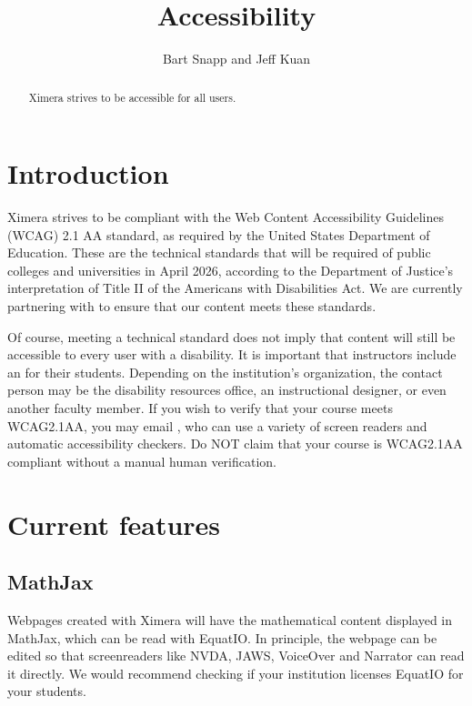 \documentclass{ximera}
\author{Bart Snapp and Jeff Kuan}
\title{Accessibility}
\begin{document}
\begin{abstract}
Ximera strives to be accessible for all users.
\end{abstract}
\maketitle

\section{Introduction}
Ximera strives to be compliant with the Web Content Accessibility Guidelines (WCAG) 2.1 AA standard, as required by the United States
Department of Education. These are the technical standards that will be required of public colleges and universities in April 2026, 
according to the Department of Justice's interpretation of Title II of the Americans with Disabilities Act. 
We are currently partnering with  
to ensure that our content meets these standards.

Of course, meeting a technical standard does not imply that content will still be accessible to every user with a disability. 
It is important that instructors include an  for their
students. Depending on the institution's organization, the contact person may be the disability resources office, an instructional designer, 
or even another faculty member. If you wish to verify that your course meets WCAG2.1AA, you may email ,
who can use a variety of screen readers and automatic accessibility checkers. Do NOT claim that your course is WCAG2.1AA compliant
without a manual human verification. 

\section{Current features}

\subsection{MathJax}
Webpages created with Ximera will have the mathematical content displayed in MathJax, which can be read with EquatIO. In principle, the webpage 
can be edited so that screenreaders like NVDA, JAWS, VoiceOver and Narrator can read it directly. We would recommend checking if your
institution licenses EquatIO for your students. 
\end{document}
